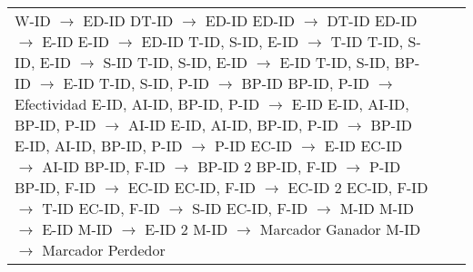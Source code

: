 \documentclass{report}
\begin{document}
\begin{tabularx}{\textwidth}{|X|X|X|}
        W-ID $\rightarrow$ ED-ID \newline 
        DT-ID $\rightarrow$ ED-ID \newline 
        ED-ID $\rightarrow$ DT-ID \newline 
        ED-ID $\rightarrow$ E-ID \newline 
        E-ID $\rightarrow$ ED-ID \newline 
        T-ID, S-ID, E-ID $\rightarrow$ T-ID \newline 
        T-ID, S-ID, E-ID $\rightarrow$ S-ID \newline 
        T-ID, S-ID, E-ID $\rightarrow$ E-ID \newline 
        T-ID, S-ID, BP-ID $\rightarrow$ E-ID \newline 
        T-ID, S-ID, P-ID $\rightarrow$ BP-ID \newline 
        BP-ID, P-ID $\rightarrow$ Efectividad \newline 
        E-ID, AI-ID, BP-ID, P-ID $\rightarrow$ E-ID \newline 
        E-ID, AI-ID, BP-ID, P-ID $\rightarrow$ AI-ID \newline 
        E-ID, AI-ID, BP-ID, P-ID $\rightarrow$ BP-ID \newline 
        E-ID, AI-ID, BP-ID, P-ID $\rightarrow$ P-ID \newline 
        EC-ID $\rightarrow$ E-ID \newline 
        EC-ID $\rightarrow$ AI-ID \newline 
        BP-ID, F-ID $\rightarrow$ BP-ID 2 \newline 
        BP-ID, F-ID $\rightarrow$ P-ID \newline 
        BP-ID, F-ID $\rightarrow$ EC-ID \newline 
        EC-ID, F-ID $\rightarrow$ EC-ID 2 \newline 
        EC-ID, F-ID $\rightarrow$ T-ID \newline 
        EC-ID, F-ID $\rightarrow$ S-ID \newline 
        EC-ID, F-ID $\rightarrow$ M-ID \newline 
        M-ID $\rightarrow$ E-ID \newline 
        M-ID $\rightarrow$ E-ID 2 \newline 
        M-ID $\rightarrow$ Marcador Ganador \newline 
        M-ID $\rightarrow$ Marcador Perdedor & 


\end{tabularx}
\end{document}
